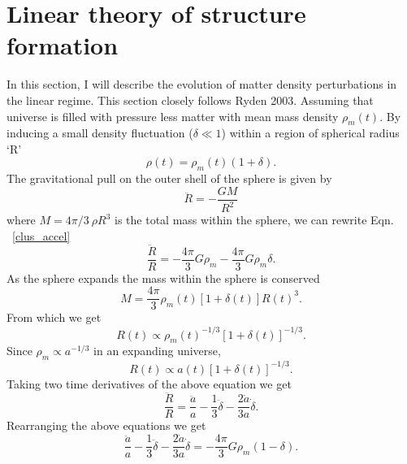 \section{Linear theory of structure formation}
\label{growth}
In this section, I will describe the evolution of matter density perturbations in the linear regime. This section closely follows Ryden 2003.
Assuming that universe is filled with pressure less matter with mean mass density $\rho_{m}(t)$. 
By inducing a small density fluctuation ($\delta \ll 1$) within a region of spherical radius `R'
\begin{equation}
\rho(t) = \rho_{m}(t)(1+\delta).
\end{equation}
 The gravitational pull on the outer shell of the sphere is given by%
\begin{equation}
\ddot{R} = -\frac{GM}{R^{2}}
\label{clus_accel}
\end{equation} 
where $M = 4 \pi /3 \: \rho R^{3}$ is the total mass within the sphere, we can rewrite Eqn. ~\ref{clus_accel}
\begin{equation}
\frac{\ddot{R}}{R}= -\frac{4\pi}{3} G\rho_{m} - \frac{4\pi}{3} G \rho_{m} \delta. 
\end{equation}
As the sphere expands the mass within the sphere is conserved
\begin{equation}
M = \frac{4\pi}{3} \rho_{m}(t)[1+\delta(t)]R(t)^{3}.
\end{equation}
From which we get 
\begin{equation}
R(t) \propto \rho_{m}(t)^{-1/3}[1+\delta(t)]^{-1/3}.
\end{equation}
Since $\rho_{m} \propto a^{-1/3}$ in an expanding universe,
\begin{equation}
R(t) \propto a(t)[1+\delta(t)]^{-1/3}.
\end{equation}
Taking two time derivatives of the above equation we get
\begin{equation}
\frac{\ddot{R}}{R}  = \frac{\ddot{a}}{a} - \frac{1}{3}\ddot{\delta} - \frac{2\dot{a}}{3a} \dot{\delta} .
\end{equation}
Rearranging the above equations we get 
\begin{equation}
\frac{\ddot{a}}{a} - \frac{1}{3}\ddot{\delta} - \frac{2\dot{a}}{3a} \dot{\delta} = -\frac{4 \pi}{3} G\rho_{m} (1-\delta).
\label{eq1}
\end{equation}
